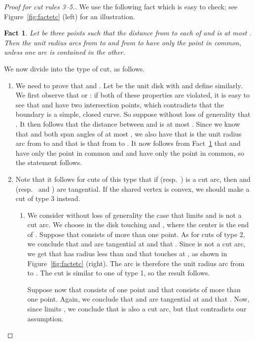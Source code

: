 \documentclass{article}
\newtheorem{fact}[theorem]{Fact}
\begin{document}
\begin{proof}[Proof for cut rules 3--5.]
We use the following fact which is easy to check; see Figure~\ref{fig:factetc} (left) for an illustration.

\begin{fact}\label{fact:fact}
Let  be three points such that the distance from  to each of  and  is at most .
Then the unit radius arcs from  to  and from  to  have only the point  in common, unless one arc is contained in the other.
\end{fact}

We now divide into the type of cut, as follows.
\begin{enumerate}
\item[3.]
We need to prove that 
 and .
Let  be the unit disk with  and define  similarly.
We first observe that  or : if both of these properties are violated, it is easy to see that  and  have two intersection points, which contradicts that the boundary  is a simple, closed curve.
So suppose without loss of generality that .
It then follows that the distance between  and  is at most .
Since we know that  and  both span angles of at most , we also have that  is the unit radius arc from  to  and that  is that from  to .
It now follows from Fact~\ref{fact:fact} that  and  have only the point  in common and  and  have only the point  in common, so the statement follows.

\item[4.]

Note that it follows for cuts of this type that if  (resp.~) is a cut arc, then  and  (resp.~ and ) are tangential.
If the shared vertex is convex, we should make a cut of type 3 instead.

\begin{enumerate}
\item[4.1]
We consider without loss of generality the case that  limits  and  is not a cut arc.
We choose  in the disk  touching  and , where the center  is the end of .
Suppose that  consists of more than one point.
As for cuts of type 2, we conclude that  and  are tangential at  and that .
Since  is not a cut arc, we get that  has radius less than  and that  touches  at , as shown in Figure~\ref{fig:factetc} (right).
The arc  is therefore the unit radius arc from  to .
The cut is similar to one of type 1, so the result follows.

Suppose now that  consists of one point and that  consists of more than one point.
Again, we conclude that  and  are tangential at  and that .
Now, since  limits , we conclude that  is also a cut arc, but that contradicts our assumption.


\end{enumerate}
\end{enumerate}
\end{proof}
\end{document}
